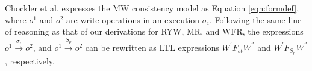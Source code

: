 \documentclass[journal,compsoc]{IEEEtran}
\begin{document}
  \par Chockler et al. expresses the MW consistency model as Equation \ref{eqn:formdef}, where %
 $\mathit{o}^1$ and $\mathit{o}^2$ are   write operations in an execution $\sigma_i$. %
  Following the same line of reasoning as that of our derivations for RYW, MR, and WFR, the expressions $\mathit{o}^1 \xrightarrow{\sigma_i} \mathit{o}^2$,
  and $\mathit{o}^1 \xrightarrow{S_p} \mathit{o}^2$  can be rewritten as LTL expressions
   $W^{'} F_\mathit{st}  W^{''}$ and $W^{'} F_{S_p} W^{''}$, respectively. 
\end{document}
